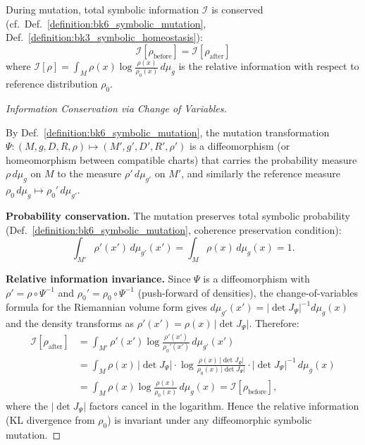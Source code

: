 \begin{lemma}
\label{lemma:bk6_conservation_of_symbolic_information}
During mutation, total symbolic information $\mathcal{I}$ is conserved (cf.~Def.~\ref{definition:bk6_symbolic_mutation}, Def.~\ref{definition:bk3_symbolic_homeostasis}):
\begin{equation}
\mathcal{I}[\rho_{\text{before}}] = \mathcal{I}[\rho_{\text{after}}]
\end{equation}
where $\mathcal{I}[\rho] = \int_M \rho(x) \log\frac{\rho(x)}{\rho_0(x)} \, d\mu_g$ is the relative information with respect to reference distribution $\rho_0$.
\begin{proof}[Information Conservation via Change of Variables]
\label{proof:bk6_information_conservation_under_mutation}
\leavevmode

By Def.~\ref{definition:bk6_symbolic_mutation}, the mutation transformation
$\Psi: (M, g, D, R, \rho) \mapsto (M', g', D', R', \rho')$
is a diffeomorphism (or homeomorphism between compatible charts) that carries the
probability measure $\rho\,d\mu_g$ on $M$ to the measure $\rho'\,d\mu_{g'}$ on $M'$,
and similarly the reference measure $\rho_0\,d\mu_g \mapsto \rho_0'\,d\mu_{g'}$.

\textbf{Probability conservation.}
The mutation preserves total symbolic probability
(Def.~\ref{definition:bk6_symbolic_mutation}, coherence preservation condition):
\[
\int_{M'}\rho'(x')\,d\mu_{g'}(x') = \int_M\rho(x)\,d\mu_g(x) = 1.
\]

\textbf{Relative information invariance.}
Since $\Psi$ is a diffeomorphism with $\rho' = \rho \circ \Psi^{-1}$ and
$\rho_0' = \rho_0 \circ \Psi^{-1}$ (push-forward of densities), the change-of-variables
formula for the Riemannian volume form gives $d\mu_{g'}(x') = |\det J_\Psi|^{-1}d\mu_g(x)$
and the density transforms as $\rho'(x') = \rho(x)\,|\det J_\Psi|$. Therefore:
\begin{align}
\mathcal{I}[\rho_{\text{after}}]
&= \int_{M'} \rho'(x') \log\frac{\rho'(x')}{\rho_0'(x')} \, d\mu_{g'}(x') \\
&= \int_M \rho(x)\,|\det J_\Psi|\cdot
   \log\frac{\rho(x)\,|\det J_\Psi|}{\rho_0(x)\,|\det J_\Psi|}
   \cdot |\det J_\Psi|^{-1}\,d\mu_g(x) \\
&= \int_M \rho(x) \log\frac{\rho(x)}{\rho_0(x)} \, d\mu_g(x)
= \mathcal{I}[\rho_{\text{before}}],
\end{align}
where the $|\det J_\Psi|$ factors cancel in the logarithm. Hence the relative information
(KL divergence from $\rho_0$) is invariant under any diffeomorphic symbolic mutation.
\end{proof}
\end{lemma}
